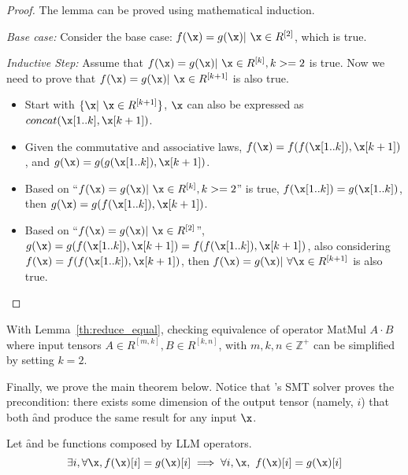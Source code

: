 \begin{proof}
The lemma can be proved using mathematical induction.

\emph{Base case:} Consider the base case: $f(\x) = g(\x) |\ \x \in R^{[2]}$, which is true.

\emph{Inductive Step:} Assume that $f(\x) = g(\x) |\ \x \in R^{[k]}, k >=2$ is true. Now we need to prove that $f(\x) = g(\x) |\ \x \in R^{[k+1]}$ is also true.
\begin{itemize}
    \item Start with $\{\x |\ \x \in R^{[k+1]}\}$, $\x$ can also be expressed as $concat(\x[1..k], \x[k+1])$.
    \item Given the commutative and associative laws, $f(\x)=f(f(\x[1..k]), \x[k+1])$, and $g(\x)=g(g(\x[1..k]), \x[k+1])$.
    \item Based on ``$f(\x) = g(\x) |\ \x \in R^{[k]}, k >=2$'' is true, $f(\x[1..k])=g(\x[1..k])$, then $g(\x)=g(f(\x[1..k]), \x[k+1])$.
    \item Based on ``$f(\x) = g(\x) |\ \x \in R^{[2]}$'', $g(\x)=g(f(\x[1..k]), \x[k+1])=f(f(\x[1..k]), \x[k+1])$, also considering $f(\x)=f(f(\x[1..k]), \x[k+1])$, then $f(\x) = g(\x) |\ \forall \x \in R^{[k+1]}$ is also true.
\end{itemize}
\end{proof}

With Lemma~\ref{th:reduce_equal}, checking equivalence of operator MatMul
$A \cdot B$ where input tensors $A \in R^{[m, k]}, B \in R^{[k, n]}$, with $m, k,
n \in \mathbb{Z}^{+}$ can be simplified by setting $k=2$.

Finally, we prove the main theorem below.
Notice that \sys's SMT solver proves the precondition:
there exists some dimension of the output tensor (namely, $i$)
that both \f and \g produce the same result for any input $\x$.

\begin{theorem}
Let \f and \g be functions composed by LLM operators.
\[
    \exists i, \forall \x, f(\x)[i]=g(\x)[i] \implies \forall i,\x, \ f(\x)[i]=g(\x)[i]
\]
\label{theorem:main}
\end{theorem}

